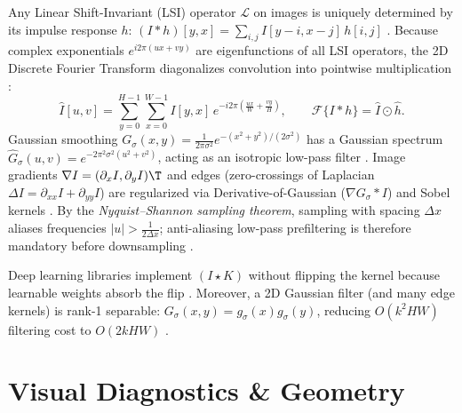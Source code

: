 \documentclass[../../../../master.tex]{subfiles}
\begin{document}
\begin{coremath}
Any Linear Shift-Invariant (LSI) operator $\mathcal{L}$ on images is uniquely determined by its impulse response $h$: $(I * h)[y,x] = \sum_{i,j} I[y-i, x-j]\, h[i,j]$ . Because complex exponentials $e^{i 2\pi(ux+vy)}$ are eigenfunctions of all LSI operators, the 2D Discrete Fourier Transform diagonalizes convolution into pointwise multiplication :
\begin{equation}
  \hat{I}[u,v] = \sum_{y=0}^{H-1}\sum_{x=0}^{W-1} I[y,x]\,e^{-i 2\pi\left(\frac{ux}{W} + \frac{vy}{H}\right)}, \qquad \mathcal{F}\{I * h\} = \hat{I} \odot \hat{h}.
\end{equation}
Gaussian smoothing $G_\sigma(x,y) = \frac{1}{2\pi\sigma^2}e^{-(x^2+y^2)/(2\sigma^2)}$ has a Gaussian spectrum $\hat{G}_\sigma(u,v) = e^{-2\pi^2\sigma^2(u^2+v^2)}$, acting as an isotropic low-pass filter . Image gradients $\nabla I = (\partial_x I, \partial_y I)\T$ and edges (zero-crossings of Laplacian $\Delta I = \partial_{xx} I + \partial_{yy} I$) are regularized via Derivative-of-Gaussian ($\nabla G_\sigma * I$) and Sobel kernels . By the \emph{Nyquist--Shannon sampling theorem}, sampling with spacing $\Delta x$ aliases frequencies $|u| > \frac{1}{2\Delta x}$; anti-aliasing low-pass prefiltering is therefore mandatory before downsampling .
\end{coremath}

\begin{intuition}
Deep learning libraries implement $(I \star K)$ without flipping the kernel because learnable weights absorb the flip . Moreover, a 2D Gaussian filter (and many edge kernels) is rank-1 separable: $G_\sigma(x,y) = g_\sigma(x)g_\sigma(y)$, reducing $O(k^2 HW)$ filtering cost to $O(2k HW)$ .
\end{intuition}

\section{Visual Diagnostics \& Geometry}
\end{document}
